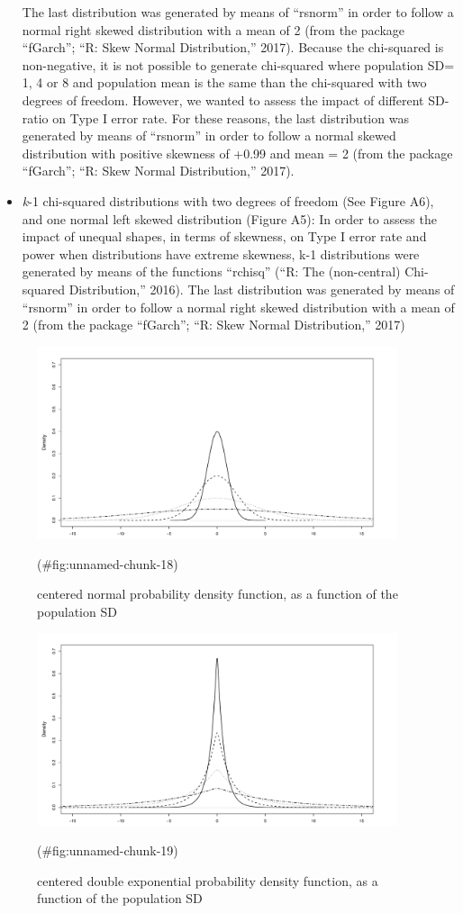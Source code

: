 \begin{appendix}
\begin{itemize}
  The last distribution was generated by means of ``rsnorm'' in order to
  follow a normal right skewed distribution with a mean of 2 (from the
  package ``fGarch''; ``R: Skew Normal Distribution,'' 2017). Because
  the chi-squared is non-negative, it is not possible to generate
  chi-squared where population SD= 1, 4 or 8 and population mean is the
  same than the chi-squared with two degrees of freedom. However, we
  wanted to assess the impact of different SD-ratio on Type I error
  rate. For these reasons, the last distribution was generated by means
  of ``rsnorm'' in order to follow a normal skewed distribution with
  positive skewness of +0.99 and mean = 2 (from the package ``fGarch'';
  ``R: Skew Normal Distribution,'' 2017).
\item
  \emph{k}-1 chi-squared distributions with two degrees of freedom (See
  Figure A6), and one normal left skewed distribution (Figure A5): In
  order to assess the impact of unequal shapes, in terms of skewness, on
  Type I error rate and power when distributions have extreme skewness,
  k-1 distributions were generated by means of the functions ``rchisq''
  (``R: The (non-central) Chi-squared Distribution,'' 2016). The last
  distribution was generated by means of ``rsnorm'' in order to follow a
  normal right skewed distribution with a mean of 2 (from the package
  ``fGarch''; ``R: Skew Normal Distribution,'' 2017)
\end{itemize}

\begin{figure}
\includegraphics[width=400px]{W-test_files/figure-latex/unnamed-chunk-18-1} \caption{centered normal probability density function, as a function of the population SD}(\#fig:unnamed-chunk-18)
\end{figure}

\begin{figure}
\includegraphics[width=400px]{W-test_files/figure-latex/unnamed-chunk-19-1} \caption{centered double exponential probability density function, as a function of the population SD}(\#fig:unnamed-chunk-19)
\end{figure}


\end{appendix}
